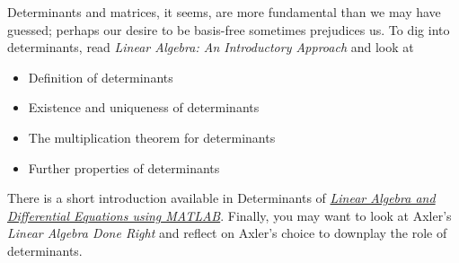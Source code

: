 \documentclass{homework}
\begin{document}
Determinants and matrices, it seems, are more fundamental than we may
have guessed; perhaps our desire to be basis-free sometimes prejudices
us.  To dig into determinants, read \textit{Linear Algebra: An
  Introductory Approach} and look at
\begin{itemize}
\item {} Definition of determinants
\item {} Existence and uniqueness of determinants
\item {} The multiplication theorem for determinants
\item {} Further properties of determinants
\end{itemize}
There is a short introduction available in 
Determinants of
\textit{\href{/courses/43735/files/folder/textbooks}{Linear Algebra
    and Differential Equations using MATLAB}}.  Finally, you may want
to look at Axler's \textit{Linear Algebra Done Right} and reflect on
Axler's choice to downplay the role of determinants.
\end{document}
